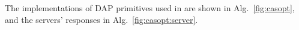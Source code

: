 %
%
 The implementations of DAP primitives used in \ares{} are shown  
in Alg.~\ref{fig:casopt}, and the servers' responses in Alg.~\ref{fig:casopt:server}.

%

